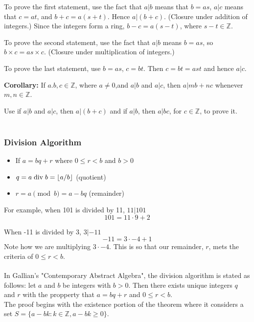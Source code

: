 To prove the first statement, use the fact that $a|b$ means that $b = as$,
$a|c$ means that $c=at$,
and $b+c = a(s+t)$.
Hence $a|(b+c)$.
(Closure under addition of integers.)
Since the integers form a ring, $b-c = a(s-t)$, where $s-t \in \mathbb{Z}$.

To prove the second statement, use the fact that $a|b$ means $b = as$, so $b\times c = as \times c$.
(Closure under multiplication of integers.)

To prove the last statement, use $b = as$, $c = bt$. Then $c = bt = ast$ and hence $a|c$.

\textbf{Corollary:}
If $a. b, c \in \mathbb{Z}$, where $a \neq 0$,and $a|b$ and $a|c$, then $a|mb + nc$ whenever $m, n \in \mathbb{Z}$.

Use if $a|b$ and $a|c$, then $a|(b+c)$ and if $a|b$, then $a|bc$,
for $c \in \mathbb{Z}$, to prove it.
\\~\\


\subsubsection{Division Algorithm}

\begin{itemize}
\item If $a = bq + r$ where $0 \leq r < b$ and $b>0$
\item $q = a \bdiv b = \lfloor a/b \rfloor$ (quotient)
\item $r = a \pmod b = a - bq$ (remainder)
\end{itemize}

For example, when 101 is divided by 11, $11|101$
$$
101 = 11 \cdot 9 + 2
$$

When -11 is divided by 3, $3|-11$
$$
-11 = 3 \cdot -4 + 1
$$
Note how we are multiplying $3\cdot -4$. This is so that our remainder, $r$, mets the criteria
of $0 \leq r < b$.
\\~\\

In Gallian's "Contemporary Abstract Algebra", the division algorithm is stated as follows:
let $a$ and $b$ be integers with $b>0$.
Then there exists unique integers $q$ and $r$ with the propperty that
$a = bq +r$ and $0 \leq r < b$.
\\

The proof begins with the existence portion of the theorem where it considers a set
$S = \{ a - bk : k\in\mathbb{Z}, a - bk \geq 0 \}$.


